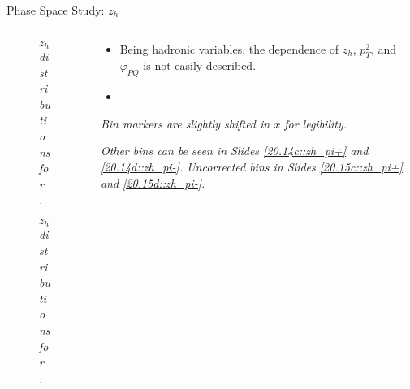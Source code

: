 \begin{frame}{Phase Space Study: $z_h$}
    \label{12.14::zh}

    \begin{columns}[onlytextwidth,T]

    \begin{column}{.44\linewidth}
        \vspace{-15pt}
        \begin{center}
            \begin{figure}[t]
                \scriptsize{\textit{$z_h$ distributions for \ef{$\pi^-$}.}}
            \end{figure}

            \vspace{-9pt}
            \begin{figure}[t]
                \scriptsize{\textit{$z_h$ distributions for \ef{$\pi^+$}.}}
            \end{figure}
        \end{center}
    \end{column}

    \begin{column}{.54\linewidth}
        \begin{itemize}
            \item
                Being hadronic variables, the \ef{$\theta$} dependence of $z_h$, $p_T^2$, and $\varphi_{PQ}$ is not easily described.

            \vspace{12pt}
            \item
        \end{itemize}

        \vspace{105pt}

        \begin{flushright}
            \tiny{\textit{Bin markers are slightly shifted in $x$ for legibility.}}

            \tiny{\textit{
                Other bins can be seen in Slides \textcolor{efd_purple}{\ref{20.14c::zh_pi+}} and \textcolor{efd_purple}{\ref{20.14d::zh_pi-}}.
                Uncorrected bins in Slides \textcolor{efd_purple}{\ref{20.15c::zh_pi+}} and \textcolor{efd_purple}{\ref{20.15d::zh_pi-}}.
            }}
        \end{flushright}
    \end{column}

    \end{columns}
\end{frame}

